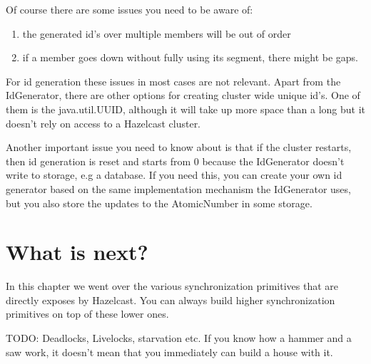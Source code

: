 Of course there are some issues you need to be aware of:
\begin{enumerate}
\item the generated id's over multiple members will be out of order
\item if a member goes down without fully using its segment, there might be gaps.
\end{enumerate}
For id generation these issues in most cases are not relevant. Apart from the IdGenerator, there are other options for creating cluster wide unique id's. One of them is the java.util.UUID, although it will take up more space than a long but it doesn't rely on access to a Hazelcast cluster.

Another important issue you need to know about is that if the cluster restarts, then id generation is reset and starts from 0 because the IdGenerator doesn't write to storage, e.g a database. If you need this, you can create your own id generator based on the same implementation mechanism the IdGenerator uses, but you also store the updates to the AtomicNumber in some storage.

\section{What is next?}
In this chapter we went over the various synchronization primitives that are directly exposes by Hazelcast. You can always build higher synchronization primitives on top of these lower ones.

TODO: Deadlocks, Livelocks, starvation etc. If you know how a hammer and a saw work, it doesn't mean that you immediately can build a house with it.
